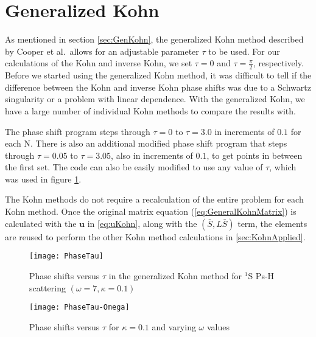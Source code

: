 \documentclass[Dissertation.tex]{subfiles}
\begin{document}


\section{Generalized Kohn}
\label{sec:CompGenKohn}
As mentioned in section \ref{sec:GenKohn}, the generalized Kohn method described by Cooper et al.\ allows for an adjustable parameter $\tau$ to be used. For our calculations of the Kohn and inverse Kohn, we set $\tau = 0$ and $\tau = \frac{\pi}{2}$, respectively. Before we started using the generalized Kohn method, it was difficult to tell if the difference between the Kohn and inverse Kohn phase shifts was due to a Schwartz singularity or a problem with linear dependence. With the generalized Kohn, we have a large number of individual Kohn methods to compare the results with.

The phase shift program steps through $\tau = 0$ to $\tau = 3.0$ in increments of $0.1$ for each N. There is also an additional modified phase shift program that steps through $\tau = 0.05$ to $\tau = 3.05$, also in increments of $0.1$, to get points in between the first set. The code can also be easily modified to use any value of $\tau$, which was used in figure \ref{fig:PhaseTau}.

The Kohn methods do not require a recalculation of the entire problem for each Kohn method. Once the original matrix equation (\cref{eq:GeneralKohnMatrix}) is calculated with the $\textbf{u}$ in \cref{eq:uKohn}, along with the $(\bar{S},L\bar{S})$ term, the elements are reused to perform the other Kohn method calculations in \cref{sec:KohnApplied}.



\setlength{\abovecaptionskip}{0pt}   %

\begin{figure}[H]
	\centering
	\texttt{[image: PhaseTau]}
	\caption[Phase shifts versus $\tau$ in the generalized Kohn method]{Phase shifts versus $\tau$ in the generalized Kohn method for $^1$S Ps-H scattering $(\omega = 7, \kappa = 0.1)$}
	\label{fig:PhaseTau}
\end{figure}

\begin{figure}[H]
	\centering
	\texttt{[image: PhaseTau-Omega]}
	\caption{Phase shifts versus $\tau$ for $\kappa = 0.1$ and varying $\omega$ values}
	\label{fig:PhaseTau-Omega}
\end{figure}
\end{document}
